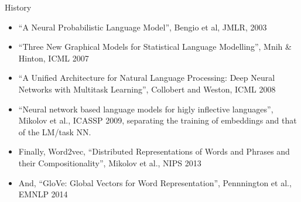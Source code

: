 \documentclass[11pt,handout]{beamer}
\begin{document}
\begin{frame}{History}
\begin{itemize}[<+->]
   \item ``A Neural Probabilistic Language Model'', Bengio et al, JMLR, 2003
   \item ``Three New Graphical Models for Statistical Language Modelling'', Mnih \& Hinton, ICML 2007
   \item ``A Unified Architecture for Natural Language Processing:
Deep Neural Networks with Multitask Learning'', Collobert and Weston, ICML 2008
   \item ``Neural network based language models for higly inflective languages'', Mikolov et al., ICASSP 2009,  separating the training of embeddings and that of the LM/task NN. 
   \item Finally, Word2vec, ``Distributed Representations of Words and Phrases and their Compositionality'', Mikolov et al., NIPS 2013
   \item And, ``GloVe: Global Vectors for Word Representation'', Pennnington et al., EMNLP 2014 
 \end{itemize}
\end{frame}
\end{document}
